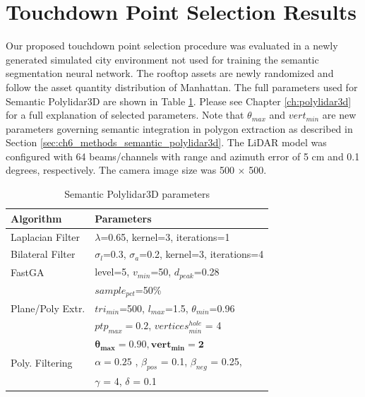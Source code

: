 \section{Touchdown Point Selection Results} \label{sec:ch6_touchdown_point_results}

Our proposed touchdown point selection procedure was evaluated in a newly generated simulated city environment not used for training the semantic segmentation neural network. The rooftop assets are newly randomized and follow the asset quantity distribution of Manhattan. The full parameters used for Semantic Polylidar3D are shown in Table \ref{table:polylidar3D_params}. Please see Chapter \ref{ch:polylidar3d} for a full explanation of selected parameters. Note that $\theta_{max}$ and $vert_{min}$ are new parameters governing semantic integration in polygon extraction as described in Section \ref{sec:ch6_methods_semantic_polylidar3d}. The LiDAR model was configured with 64 beams/channels with range and azimuth error of 5 cm and 0.1 degrees, respectively. The camera image size was 500 $\times$ 500. 

\begin{table}[ht]
\centering
\caption{Semantic Polylidar3D parameters}\label{table:polylidar3D_params}
\begin{tabular}{@{}ll@{}}
\toprule
Algorithm        & Parameters                                                          \\ \midrule
Laplacian Filter & $\lambda$=0.65, kernel=3, iterations=1   \\
Bilateral Filter & $\sigma_l$=0.3, $\sigma_a$=0.2, kernel=3, iterations=4 \\
FastGA           & level=5,  $v_{min}$=50, $d_{peak}$=0.28            \\
                 & $sample_{pct}$=50\% \\
Plane/Poly Extr. & $tri_{min}$=500,  $l_{max}$=1.5, $\theta_{min}$=0.96 \\
                 & $ptp_{max} = 0.2$, $vertices^{hole}_{min}$ = 4  \\
                 & $\mathbf{\theta_{max} = 0.90, vert_{min}= 2}$ \\
Poly. Filtering  & $\alpha = 0.25$ , $\beta_{pos}$ = 0.1, $\beta_{neg}$ = 0.25, \\
                 & $\gamma$ = 4, $\delta$ = 0.1      \\ \bottomrule
\end{tabular}
\end{table}

